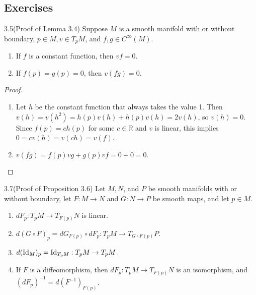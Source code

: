 \subsection{Exercises}
\begin{customexer}{3.5(Proof of Lemma 3.4)}
  Suppose $M$ is a smooth manifold with or without boundary, $p \in M, v \in T_pM$, and $f, g \in C^{\infty}(M)$.
  \begin{enumerate}[label=(\alph*)]
    \item 
      If $f$ is a constant function, then $vf = 0$.
    \item
      If $f(p) = g(p) = 0$, then $v(fg) = 0$.
  \end{enumerate}
\end{customexer}

\begin{proof}
  $ $
  \begin{enumerate}[label=(\alph*)]
    \item
      Let $h$ be the constant function that always takes the value 1.
      Then $v(h) = v(h^2) = h(p)v(h) + h(p)v(h) = 2v(h)$, so $v(h) = 0$.
      Since $f(p) = ch(p)$ for some $c \in \mathbb{R}$ and $v$ is linear, this implies $0 = cv(h) = v(ch) = v(f)$.
    \item
      $v(fg) = f(p)vg + g(p)vf = 0 + 0 = 0$.
  \end{enumerate}
\end{proof}

\begin{customexer}{3.7(Proof of Proposition 3.6)}
  Let $M, N$, and $P$ be smooth manifolds with or without boundary, let $F: M \rightarrow N$ and $G: N \rightarrow P$ be smooth maps, and let $p \in M$.
  \begin{enumerate}[label=(\alph*)]
    \item
      $dF_p:T_pM \rightarrow T_{F(p)}N$ is linear.
    \item
      $d(G \circ F)_p = dG_{F(p)} \circ dF_p: T_pM \rightarrow T_{G \circ F(p)} P$.
    \item
      $d(\operatorname{Id}_M)_p = \operatorname{Id}_{T_pM}: T_pM \rightarrow T_pM$.
    \item
      If $F$ is a diffeomorphism, then $dF_p: T_pM \rightarrow T_{F(p)}N$ is an isomorphism, and $(dF_p)^{-1} = d(F^{-1})_{F(p)}$.
  \end{enumerate}
\end{customexer}

